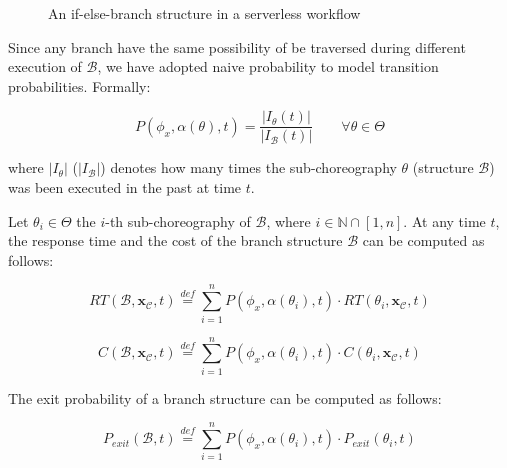 \documentclass[12pt,a4paper]{report}
\newcommand{\mathDef}{\overset{\textit{def}}{=}}
\newcommand{\N}{\mathbb{N}}
\begin{document}
\begin{figure}
	\caption{An if-else-branch structure in a serverless workflow}
\end{figure}

Since any branch have the same possibility of be traversed during different execution of $\mathcal{B}$, we have adopted naive probability to model transition probabilities. Formally:

\begin{equation}\label{naiveProbability}
	P(\phi_x, \alpha(\theta),t) = \dfrac{|I_{\theta}(t)|}{|I_{\mathcal{B}}(t)|} \qquad \forall \theta \in \Theta
\end{equation}

where $|I_{\theta}|$ ($|I_{\mathcal{B}}|$) denotes how many times the sub-choreography $\theta$ (structure $\mathcal{B}$) was been executed in the past at time $t$.

Let $\theta_i \in \Theta$ the $i$-th sub-choreography of $\mathcal{B}$, where $i \in \N \cap \left[1,n\right]$. At any time $t$, the response time and the cost of the branch structure $\mathcal{B}$ can be computed as follows:

\begin{equation}
	RT(\mathcal{B},\textbf{x}_{\mathcal{C}}, t) \mathDef \sum_{i = 1}^n P(\phi_{x}, \alpha(\theta_i),t) \cdot  RT(\theta_i,\textbf{x}_{\mathcal{C}}, t)
\end{equation}

\begin{equation}
	C(\mathcal{B},\textbf{x}_{\mathcal{C}}, t) \mathDef \sum_{i = 1}^n P(\phi_{x}, \alpha(\theta_i),t) \cdot C(\theta_i,\textbf{x}_{\mathcal{C}}, t)
\end{equation}

The exit probability of a branch structure can be computed as follows:

\begin{equation}
	P_{exit}(\mathcal{B}, t) \mathDef \sum_{i = 1}^n P(\phi_{x}, \alpha(\theta_i),t) \cdot P_{exit}(\theta_i, t)
\end{equation}
\end{document}
